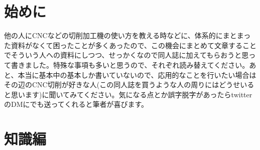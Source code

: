 \documentclass[onecolumn]{preport}
\begin{document}

\part*{始めに}

他の人にCNCなどの切削加工機の使い方を教える時などに、体系的にまとまった資料がなくて困ったことが多くあったので、この機会にまとめて文章することでそういう人への資料にしつつ、せっかくなので同人誌に加えてもらおうと思って書きました。特殊な事項も多いと思うので、それぞれ読み替えてください。あと、本当に基本中の基本しか書いていないので、応用的なことを行いたい場合はその辺のCNC切削が好きな人(この同人誌を買うような人の周りにはどうせいると思います)に聞いてみてください。気になる点とか誤字脱字があったらtwitterのDMにでも送ってくれると筆者が喜びます。

\part{知識編}
\end{document}
